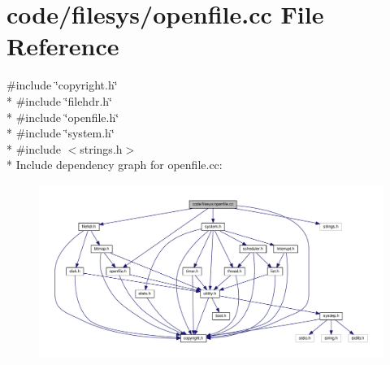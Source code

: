 \section{code/filesys/openfile.cc File Reference}
\label{openfile_8cc}
{\ttfamily \#include \char`\"{}copyright.\+h\char`\"{}}\\*
{\ttfamily \#include \char`\"{}filehdr.\+h\char`\"{}}\\*
{\ttfamily \#include \char`\"{}openfile.\+h\char`\"{}}\\*
{\ttfamily \#include \char`\"{}system.\+h\char`\"{}}\\*
{\ttfamily \#include $<$strings.\+h$>$}\\*
Include dependency graph for openfile.\+cc\+:
\nopagebreak
\begin{figure}[H]
\begin{center}
\leavevmode
\includegraphics[width=350pt]{openfile_8cc__incl}
\end{center}
\end{figure}
